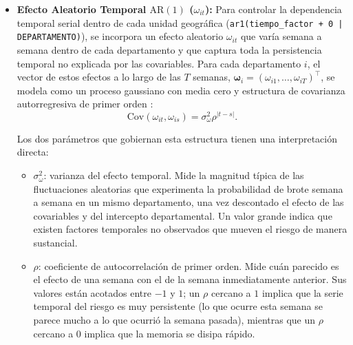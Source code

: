 \documentclass[11pt,a4paper]{article}
\begin{document}
\begin{itemize}
	\begin{equation}
		u_i \sim \mathcal{N}(0, \sigma_u^2), \qquad i=1,\dots,18.
	\end{equation}

	Captura la heterogeneidad no observada entre los 18 departamentos, permitiendo que cada región posea su propio nivel basal de riesgo endémico.

	Este término corresponde a un intercepto aleatorio por departamento o región autónoma \parencite{fitzmaurice2011applied} (\texttt{(1 | DEPARTAMENTO)}). No se estima una varianza independiente para cada departamento, sino una única varianza común $\sigma_u^2$ que describe cuán dispersos están los niveles basales de riesgo log-odds de los 18 departamentos alrededor del intercepto global $\beta_0$. Así, el intercepto efectivo del departamento $i$ es $\beta_0 + u_i$. Este componente modela diferencias departamentales no observadas.

	\item \textbf{Efecto Aleatorio Temporal $\text{AR}(1)$ ($\omega_{it}$):}
	Para controlar la dependencia temporal serial dentro de cada unidad geográfica (\texttt{ar1(tiempo\_factor + 0 | DEPARTAMENTO)}), se incorpora un efecto aleatorio $\omega_{it}$ que varía semana a semana dentro de cada departamento y que captura toda la persistencia temporal no explicada por las covariables. Para cada departamento $i$, el vector de estos efectos a lo largo de las $T$ semanas, $\boldsymbol{\omega}_i = (\omega_{i1}, \dots, \omega_{iT})^\top$, se modela como un proceso gaussiano con media cero y estructura de covarianza autorregresiva de primer orden \parencite{diggle2002analysis}:
	\begin{equation}
		\text{Cov}(\omega_{it}, \omega_{is}) = \sigma_\omega^2 \rho^{|t - s|}.
		\label{eq:ar1}
	\end{equation}

	Los dos parámetros que gobiernan esta estructura tienen una interpretación directa:

	\begin{itemize}
		\item $\sigma_\omega^2$: varianza del efecto temporal. Mide la magnitud típica de las fluctuaciones aleatorias que experimenta la probabilidad de brote semana a semana en un mismo departamento, una vez descontado el efecto de las covariables y del intercepto departamental. Un valor grande indica que existen factores temporales no observados que mueven el riesgo de manera sustancial.
		\item $\rho$: coeficiente de autocorrelación de primer orden. Mide cuán parecido es el efecto de una semana con el de la semana inmediatamente anterior. Sus valores están acotados entre $-1$ y $1$; un $\rho$ cercano a $1$ implica que la serie temporal del riesgo es muy persistente (lo que ocurre esta semana se parece mucho a lo que ocurrió la semana pasada), mientras que un $\rho$ cercano a $0$ implica que la memoria se disipa rápido.
	\end{itemize}


\end{itemize}
\end{document}

